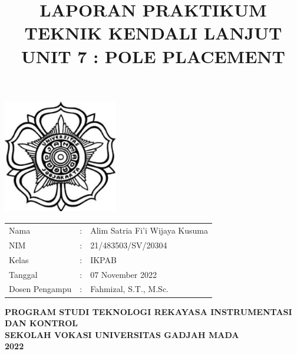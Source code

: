 \documentclass[12 pt]{article}
\title{\large \textbf{LAPORAN PRAKTIKUM TEKNIK KENDALI LANJUT} \\ \textbf{UNIT 7 : POLE PLACEMENT}\linebreak}
\author{}
\date{}
\begin{document}
\clearpage
\maketitle
\thispagestyle{empty} %

\begin{center}
\includegraphics[width=5cm,height=5cm]{cover_laporan/logo_ugm.png}
\end{center}

\vspace{1 cm}

\begin{center}
\begin{tabular}{lcl}
Nama & : & Alim Satria Fi'i Wijaya Kusuma \\
NIM & : & 21/483503/SV/20304\\
Kelas & : & IKPAB\\
Tanggal & : & 07 November 2022 \\
Dosen Pengampu & : & Fahmizal, S.T., M.Sc.
\end{tabular}
\newline
\newline
\newline
\newline
\large{\textbf{PROGRAM STUDI TEKNOLOGI REKAYASA INSTRUMENTASI DAN KONTROL}} \\
\textbf{SEKOLAH VOKASI UNIVERSITAS GADJAH MADA} \\
\textbf{2022}
\end{center}

\pagebreak
\tableofcontents
\pagebreak
\listoffigures
\pagebreak
\listoftables
\pagebreak


\end{document}

